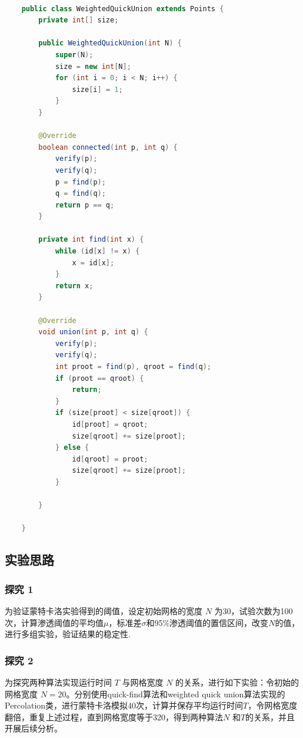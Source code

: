 \documentclass[12pt,a4paper]{ctexart}
\begin{document}
\begin{lstlisting}[language=java,showstringspaces=false,]

    public class WeightedQuickUnion extends Points {
        private int[] size;
    
        public WeightedQuickUnion(int N) {
            super(N);
            size = new int[N];
            for (int i = 0; i < N; i++) {
                size[i] = 1;
            }
        }
    
        @Override
        boolean connected(int p, int q) {
            verify(p);
            verify(q);
            p = find(p);
            q = find(q);
            return p == q;
        }
    
        private int find(int x) {
            while (id[x] != x) {
                x = id[x];
            }
            return x;
        }
    
        @Override
        void union(int p, int q) {
            verify(p);
            verify(q);
            int proot = find(p), qroot = find(q);
            if (proot == qroot) {
                return;
            }
            if (size[proot] < size[qroot]) {
                id[proot] = qroot;
                size[qroot] += size[proot];
            } else {
                id[qroot] = proot;
                size[qroot] += size[proot];
            }
    
        }
    
    }
\end{lstlisting}

\subsection{实验思路}
\subsubsection*{探究 1}
为验证蒙特卡洛实验得到的阈值，设定初始网格的宽度 $N$ 为30，试验次数为100次，计算渗透阈值的平均值$\mu$，标准差$\sigma$和95\%渗透阈值的置信区间，改变$N$的值，进行多组实验，验证结果的稳定性.
\subsubsection*{探究 2}
为探究两种算法实现运行时间 $T$ 与网格宽度 $N$ 的关系，进行如下实验：令初始的网格宽度 $N=20$。分别使用quick-find算法和weighted quick union算法实现的Percolation类，进行蒙特卡洛模拟40次，计算并保存平均运行时间$T$，令网格宽度翻倍，重复上述过程，直到网格宽度等于320，得到两种算法$N$
和$T$的关系，并且开展后续分析。
\end{document}
